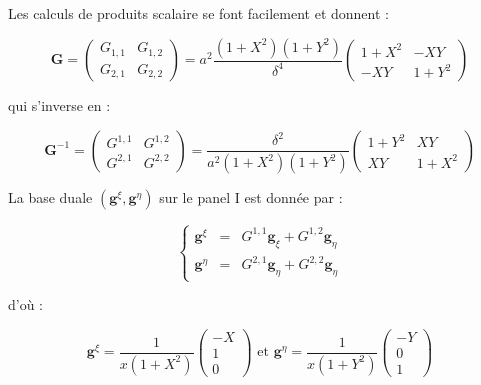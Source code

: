 Les calculs de produits scalaire se font facilement et donnent :

\begin{equation}
\mathbf{G} = \begin{pmatrix}
G_{1,1} & G_{1,2} \\ G_{2,1} & G_{2,2}
\end{pmatrix} 
= a^2 \dfrac{(1+X^2)(1+Y^2)}{\delta^4} \begin{pmatrix}
1+X^2 & -XY \\ -XY & 1+Y^2
\end{pmatrix}
\end{equation}

qui s'inverse en :

\begin{equation}
\mathbf{G}^{-1} = \begin{pmatrix}
G^{1,1} & G^{1,2} \\ G^{2,1} & G^{2,2}
\end{pmatrix} = \dfrac{\delta^2}{a^2 (1+X^2)(1+Y^2)} \begin{pmatrix}
1+Y^2 & XY \\ XY & 1+X^2
\end{pmatrix}
\label{eq: metrique inverse}
\end{equation}

La base duale $(\mathbf{g}^{\xi}, \mathbf{g}^{\eta})$ sur le panel I est donnée par :

\begin{equation}
\left\lbrace
\begin{array}{rcl}
\mathbf{g}^{\xi} & = & G^{1,1} \mathbf{g}_{\xi} + G^{1,2} \mathbf{g}_{\eta} \\
\mathbf{g}^{\eta} & = & G^{2,1} \mathbf{g}_{\eta} + G^{2,2} \mathbf{g}_{\eta}
\end{array}
\right.
\end{equation}

d'où :

\begin{equation}
\mathbf{g}^{\xi} = \dfrac{1}{x(1+X^2)}\begin{pmatrix}
-X \\ 1 \\ 0
\end{pmatrix} \text{ et } \mathbf{g}^{\eta} = \dfrac{1}{x(1+Y^2)}\begin{pmatrix}
-Y \\ 0 \\ 1
\end{pmatrix}
\label{eq: base duale I}
\end{equation}







